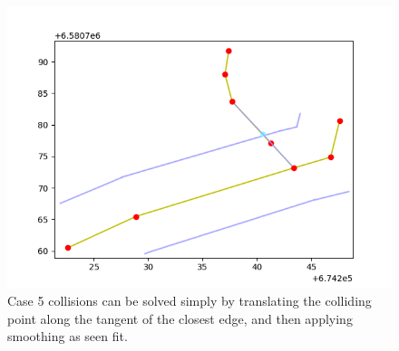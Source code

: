 \documentclass[a4paper]{article}
\begin{document}
\begin{figure}[H]
    \centering
    \includegraphics[width=\textwidth,height=0.5\textheight,keepaspectratio]{img_feature_overlap_fix_4}
    \caption{Case 5 collisions can be solved simply by translating the colliding point along the tangent of the closest edge, and then applying smoothing as seen fit.}
    \label{fig:space}
\end{figure}
\end{document}
